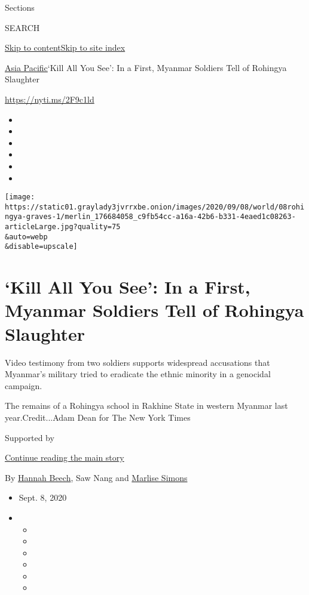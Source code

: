Sections

SEARCH

\protect\hyperlink{site-content}{Skip to
content}\protect\hyperlink{site-index}{Skip to site index}

\href{/section/world/asia}{Asia Pacific}\textbar{}`Kill All You See': In
a First, Myanmar Soldiers Tell of Rohingya Slaughter

\url{https://nyti.ms/2F9c1ld}

\begin{itemize}
\item
\item
\item
\item
\item
\item
\end{itemize}

\texttt{[image: https://static01.graylady3jvrrxbe.onion/images/2020/09/08/world/08rohingya-graves-1/merlin\_176684058\_c9fb54cc-a16a-42b6-b331-4eaed1c08263-articleLarge.jpg?quality=75\\\&auto=webp\\\&disable=upscale]}

\hypertarget{kill-all-you-see-in-a-first-myanmar-soldiers-tell-of-rohingya-slaughter}{%
\section{`Kill All You See': In a First, Myanmar Soldiers Tell of
Rohingya
Slaughter}\label{kill-all-you-see-in-a-first-myanmar-soldiers-tell-of-rohingya-slaughter}}

Video testimony from two soldiers supports widespread accusations that
Myanmar's military tried to eradicate the ethnic minority in a genocidal
campaign.

The remains of a Rohingya school in Rakhine State in western Myanmar
last year.Credit...Adam Dean for The New York Times

Supported by

\protect\hyperlink{after-sponsor}{Continue reading the main story}

By \href{https://www.nytimes3xbfgragh.onion/by/hannah-beech}{Hannah
Beech}, Saw Nang and
\href{https://www.nytimes3xbfgragh.onion/by/marlise-simons}{Marlise
Simons}

\begin{itemize}
\item
  Sept. 8, 2020
\item
  \begin{itemize}
  \item
  \item
  \item
  \item
  \item
  \item
  \end{itemize}
\end{itemize}

